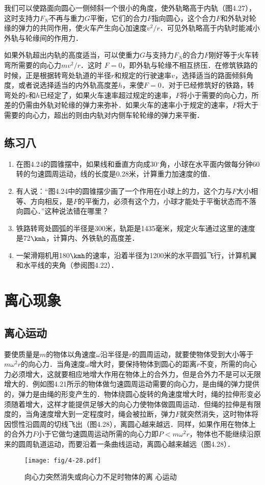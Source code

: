 我们可以使路面向圆心一侧倾斜一个很小的角度，使外轨略高于内轨（图4.27），这时支持力$F_N$不再与重力$G$平衡，它们的合力$F$指向圆心，这个合力$F$和外轨对轮缘的弹力的共同作用，使火车产生向心加速度$v^2/r$．可见外轨略高于内轨时能减小外轨与轮缘间的作用力．


如果外轨超出内轨的高度适当，可以使重力$G$与支持力$F_N$的合力$F$刚好等于火车转弯所需要的向心力$mv^2/r$．这时
$F=0$，即外轨与轮缘不相互挤压．在修筑铁路的时候，正是根据转弯处轨道的半径$r$和规定的行驶速率$v$，选择适当的路面倾斜角度，或者说选择适当的内外轨高度差$h$，来使$F=0$．对于已经修筑好的铁路，转弯处的$r$和$h$已经定了，如果火车速率超过规定的速率，$F$将小于需要的向心力，所差的仍需由外轨对轮缘的弹力来弥补．如果火车的速率小于规定的速率，$F$将大于需要的向心力，超出的则由内轨对内侧车轮轮缘的弹力来平衡．

\subsection*{练习八}
\begin{enumerate}
	\item 在图4.24的圆锥摆中，如果线和垂直方向成30$^\circ$角，小球在水平面内做每分钟60转的匀速圆周运动，线的长度是0.28米，计算重力加速度的值．
\item 有人说：“图4.24中的圆锥摆少画了一个作用在小球上的力，这个力与$F$大小相等、方向相反，是$F$的平衡力，必须有这个力，小球才能处于平衡状态而不落向圆心．”这种说法错在哪里？
\item 铁路转弯处圆弧的半径是300米，轨距是1435毫米，规定火车通过这里的速度是72$\kmh$，计算内、外铁轨的高度差．
\item 一架滑翔机用180$\kmh$的速率，沿着半径为1200米的水平圆弧飞行，计算机翼和水平线的夹角（参阅图4.22）．
\end{enumerate}

\section{离心现象}
\subsection{离心运动} 

要使质量是$m$的物体以角速度$\omega$沿半径是$r$的圆周运动，就要使物体受到大小等于$m\omega^2r$的向心力．当角速度$\omega$增大时，要保持物体到圆心的距离$r$不变，所需的向心力必须增大，这就要相应地增大作用在物体上的合外力，但是合外力不是可以无限增大的．例如图4.21所示的物体做匀速圆周运动需要的向心力，是由绳的弹力提供的，弹力是由绳的形变产生的．物体绕圆心旋转的角速度增大时，绳的拉伸形变必须随着增大，这样才能提供足够大的向心力使物体做圆周运动．但绳的拉伸是有限度的，当角速度增大到一定程度时，绳会被拉断，弹力$F$就突然消失，这时物体将因惯性沿圆周的切线飞出（图4.28），离圆心越来越远．同样，如果作用在物体上的合外力$F$小于它做匀速圆周运动所需的向心力即$P<m\omega^2 r$，物体也不能继续沿原来的圆周轨道运动，而要沿着一条曲线运动，离圆心越来越远（图4.28）．
\begin{figure}\centering
\texttt{[image: fig/4-28.pdf]}
\caption{向心力突然消失或向心力不足时物体的离
心运动}
\end{figure}


